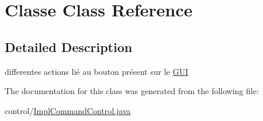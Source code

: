 \hypertarget{class_classe}{}\section{Classe Class Reference}
\label{class_classe}


\subsection{Detailed Description}
differentes actions lié au bouton présent sur le \mbox{\hyperlink{namespace_g_u_i}{G\+UI}} 

The documentation for this class was generated from the following file\+:\begin{DoxyCompactItemize}
\item 
control/\mbox{\hyperlink{_impl_command_control_8java}{Impl\+Command\+Control.\+java}}\end{DoxyCompactItemize}

